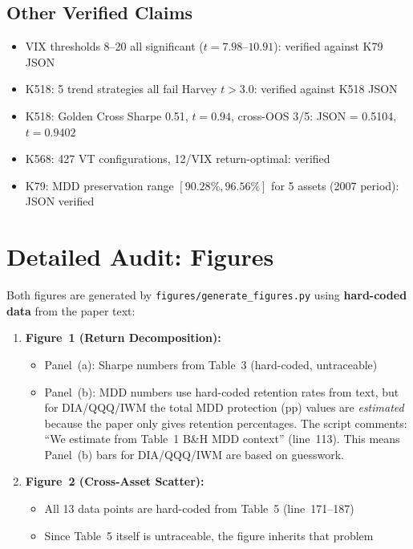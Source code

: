 \documentclass[12pt,a4paper]{article}
\begin{document}
\subsection{Other Verified Claims}

\begin{itemize}
    \item VIX thresholds 8--20 all significant ($t = 7.98$--$10.91$): verified against K79 JSON \checkmark
    \item K518: 5 trend strategies all fail Harvey $t > 3.0$: verified against K518 JSON \checkmark
    \item K518: Golden Cross Sharpe 0.51, $t = 0.94$, cross-OOS 3/5: JSON = 0.5104, $t = 0.9402$ \checkmark
    \item K568: 427 VT configurations, 12/VIX return-optimal: verified \checkmark
    \item K79: MDD preservation range $[90.28\%, 96.56\%]$ for 5 assets (2007 period): JSON verified \checkmark
\end{itemize}


\section{Detailed Audit: Figures}
\label{sec:figures}

Both figures are generated by \texttt{figures/generate\_figures.py} using \textbf{hard-coded data} from the paper text:

\begin{enumerate}
    \item \textbf{Figure~1 (Return Decomposition):}
    \begin{itemize}
        \item Panel~(a): Sharpe numbers from Table~3 (hard-coded, untraceable)
        \item Panel~(b): MDD numbers use hard-coded retention rates from text, but for DIA/QQQ/IWM the total MDD protection (pp) values are \textit{estimated} because the paper only gives retention percentages. The script comments: ``We estimate from Table~1 B\&H MDD context'' (line~113). This means Panel~(b) bars for DIA/QQQ/IWM are based on guesswork.
    \end{itemize}

    \item \textbf{Figure~2 (Cross-Asset Scatter):}
    \begin{itemize}
        \item All 13 data points are hard-coded from Table~5 (line~171--187)
        \item Since Table~5 itself is untraceable, the figure inherits that problem
    \end{itemize}
\end{enumerate}
\end{document}
